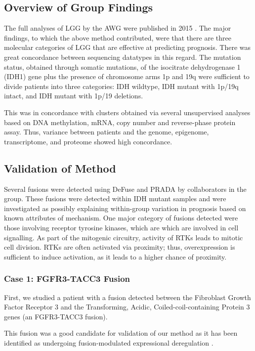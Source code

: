 \subsection{Overview of Group Findings}
The full analyses of LGG by the AWG were published in 2015 \cite{_comprehensive_2015}. The major findings, to which the above method contributed, were that there are three molecular categories of LGG that are effective at predicting prognosis. There was great concordance between sequencing datatypes in this regard. The mutation status, obtained through somatic mutations, of the isocitrate dehydrogenase 1 (IDH1) gene plus the presence of chromosome arms 1p and 19q were sufficient to divide patients into three categories: IDH wildtype, IDH mutant with 1p/19q intact, and IDH mutant with 1p/19 deletions.

This was in concordance with clusters obtained via several unsupervised analyses based on DNA methylation, mRNA, copy number and reverse-phase protein assay. Thus, variance between patients and the genome, epigenome, transcriptome, and proteome showed high concordance.

\subsection{Validation of Method}

Several fusions were detected using DeFuse\cite{mcpherson_defuse:_2011} and PRADA by collaborators in the group. These fusions were detected within IDH mutant samples and were investigated as possibly explaining within-group variation in prognosis based on known attributes of mechanism. One major category of fusions detected were those involving receptor tyrosine kinases, which are which are involved in cell signalling. As part of the mitogenic circuitry, activity of RTKs leads to mitotic cell division. RTKs are often activated via proximity; thus, overexpression is sufficient to induce activation, as it leads to a higher chance of proximity. 

\subsubsection{Case 1: FGFR3-TACC3 Fusion}

First, we studied a patient with a fusion detected between the Fibroblast Growth Factor Receptor 3 and the Transforming, Acidic, Coiled-coil-containing Protein 3 genes (an FGFR3-TACC3 fusion).

This fusion was a good candidate for validation of our method as it has been identified as undergoing fusion-modulated expressional deregulation \cite{parker_tumorigenic_2013}.

